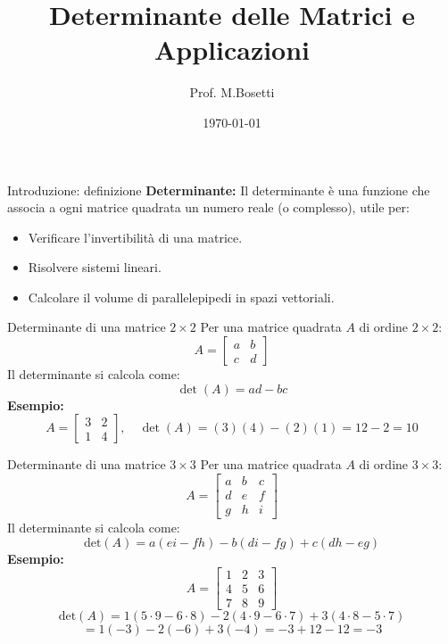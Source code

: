 \documentclass{beamer}
\title{Determinante delle Matrici e Applicazioni}
\author{Prof. M.Bosetti}
\date{\today}
\begin{document}
\frame{\titlepage}

\begin{frame}{Introduzione: definizione}
    \textbf{Determinante:} Il determinante è una funzione che associa a ogni matrice quadrata un numero reale (o complesso), utile per: 
    \begin{itemize}
        \item Verificare l'invertibilità di una matrice.
        \item Risolvere sistemi lineari.
        \item Calcolare il volume di parallelepipedi in spazi vettoriali.
    \end{itemize}
\end{frame}

\begin{frame}{Determinante di una matrice $2 \times 2$}
    Per una matrice quadrata $A$ di ordine $2 \times 2$: 
$$
    A = \begin{bmatrix}
    a & b \\
    c & d
    \end{bmatrix}
$$
    Il determinante si calcola come:
$$
    \det(A) = ad - bc
$$
    \textbf{Esempio:}
$$
    A = \begin{bmatrix}
    3 & 2 \\
    1 & 4
    \end{bmatrix}, \quad \det(A) = (3)(4) - (2)(1) = 12 - 2 = 10
$$
\end{frame}

\begin{frame}{Determinante di una matrice $3 \times 3$}
    Per una matrice quadrata $A$ di ordine $3 \times 3$:
$$
    A = \begin{bmatrix}
    a & b & c \\
    d & e & f \\
    g & h & i
    \end{bmatrix}
$$
    Il determinante si calcola come:
$$
    \text{det}(A) = a(ei - fh) - b(di - fg) + c(dh - eg)
$$
    \textbf{Esempio:}
$$
    A = \begin{bmatrix}
    1 & 2 & 3 \\
    4 & 5 & 6 \\
    7 & 8 & 9
    \end{bmatrix}
$$
$$
    \text{det}(A) = 1(5 \cdot 9 - 6 \cdot 8) - 2(4 \cdot 9 - 6 \cdot 7) + 3(4 \cdot 8 - 5 \cdot 7)
$$
$$
    = 1(-3) - 2(-6) + 3(-4) = -3 + 12 - 12 = -3
$$
\end{frame}
\end{document}
